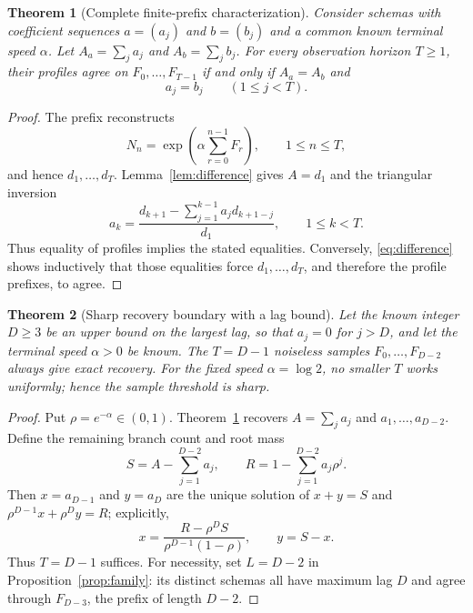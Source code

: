 \documentclass[10pt,twocolumn]{article}
\theoremstyle{cleanprop}
\newtheorem{theorem}{Theorem}
\begin{document}
\begin{theorem}[Complete finite-prefix characterization]\label{thm:prefix}
Consider schemas with coefficient sequences $a=(a_j)$ and $b=(b_j)$ and a
common known terminal speed $\alpha$. Let
$A_a=\sum_j a_j$ and $A_b=\sum_j b_j$. For every observation horizon $T\ge1$,
their profiles agree on $F_0,\ldots,F_{T-1}$ if and only if $A_a=A_b$ and
\[
a_j=b_j\qquad(1\le j<T).
\]
\end{theorem}
\begin{proof}
The prefix reconstructs
\[
N_n=\exp\!\left(\alpha\sum_{r=0}^{n-1}F_r\right),\qquad 1\le n\le T,
\]
and hence $d_1,\ldots,d_T$. Lemma~\ref{lem:difference} gives $A=d_1$ and the
triangular inversion
\begin{equation}
a_k=\frac{d_{k+1}-\sum_{j=1}^{k-1}a_jd_{k+1-j}}{d_1},
\qquad 1\le k<T.
\label{eq:triangular}
\end{equation}
Thus equality of profiles implies the stated equalities. Conversely,
\eqref{eq:difference} shows inductively that those equalities force
$d_1,\ldots,d_T$, and therefore the profile prefixes, to agree.
\end{proof}

\begin{theorem}[Sharp recovery boundary with a lag bound]\label{cor:positive}
Let the known integer $D\ge3$ be an upper bound on the largest lag, so that
$a_j=0$ for $j>D$, and let the terminal speed $\alpha>0$ be known. The
$T=D-1$ noiseless samples $F_0,\ldots,F_{D-2}$ always give exact recovery.
For the fixed speed $\alpha=\log2$, no smaller $T$ works uniformly; hence the
sample threshold is sharp.
\end{theorem}
\begin{proof}
Put $\rho=e^{-\alpha}\in(0,1)$. Theorem~\ref{thm:prefix} recovers
$A=\sum_j a_j$ and $a_1,\ldots,a_{D-2}$. Define the remaining branch count
and root mass
\[
S=A-\sum_{j=1}^{D-2}a_j,\qquad
R=1-\sum_{j=1}^{D-2}a_j\rho^j.
\]
Then $x=a_{D-1}$ and $y=a_D$ are the unique solution of
$x+y=S$ and $\rho^{D-1}x+\rho^D y=R$; explicitly,
\[
x=\frac{R-\rho^D S}{\rho^{D-1}(1-\rho)},\qquad y=S-x.
\]
Thus $T=D-1$ suffices. For necessity, set $L=D-2$ in
Proposition~\ref{prop:family}: its distinct schemas all have maximum lag $D$
and agree through $F_{D-3}$, the prefix of length $D-2$.
\end{proof}
\end{document}
